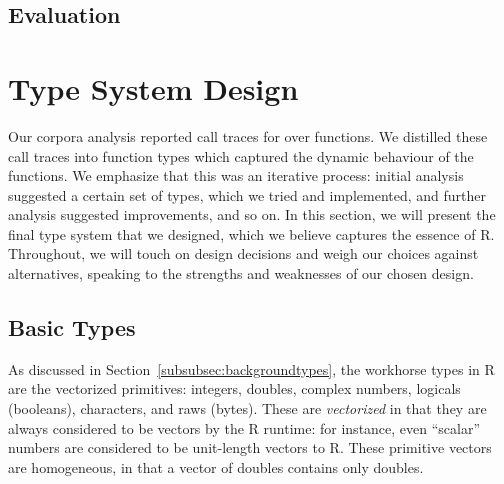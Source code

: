 \documentclass[acmsmall,review,anonymous]{acmart}\settopmatter{printfolios=true,printccs=false,printacmref=false}
\begin{document}

\subsection{Evaluation}



%
%
%
%
%
%
\section{Type System Design}
\label{sec:typesystemdesign}

Our corpora analysis reported  call traces for over  functions.
We distilled these call traces into function types which captured the dynamic behaviour of the functions.
We emphasize that this was an iterative process: initial analysis suggested a certain set of types, which we tried and implemented, and further analysis suggested improvements, and so on.
In this section, we will present the final type system that we designed, which we believe captures the essence of R.
Throughout, we will touch on design decisions and weigh our choices against alternatives, speaking to the strengths and weaknesses of our chosen design.

%
%
%
%
\subsection{Basic Types}
\label{subsec:basictypes}

As discussed in Section~\ref{subsubsec:backgroundtypes}, the workhorse types in R are the vectorized primitives: integers, doubles, complex numbers, logicals (booleans), characters, and raws (bytes).
These are {\it vectorized} in that they are always considered to be vectors by the R runtime: for instance, even ``scalar'' numbers are considered to be unit-length vectors to R.
These primitive vectors are homogeneous, in that a vector of doubles contains only doubles.
\end{document}
